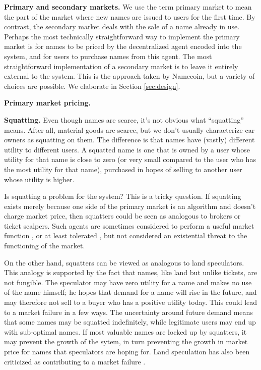 {\bf Primary and secondary markets.} We use the term primary market to mean the part of the market where new names are issued to users for the first time. By contrast, the secondary market deals with the sale of a name already in use. Perhaps the most technically straightforward way to implement the primary market is for names to be priced by the decentralized agent \hi{[elaborate]} encoded into the system, and for users to purchase names from this agent. The most straightforward implementation of a secondary market is to leave it entirely external to the system. This is the approach taken by Namecoin, but a variety of choices are possible. We elaborate in Section \ref{sec:design}.

{\bf Primary market pricing.} 

{\bf Squatting.} Even though names are scarce, it's not obvious what ``squatting'' means. After all, material goods are scarce, but we don't usually characterize car owners as squatting on them. The difference is that names have (vastly) different utility to different users. A squatted name is one that is owned by a user whose utility for that name is close to zero (or very small compared to the user who has the most utility for that name), purchased in hopes of selling to another user whose utility is higher.

Is squatting a problem for the system? This is a tricky question. If squatting exists merely because one side of the primary market is an algorithm and doesn't charge market price, then squatters could be seen as analogous to brokers or ticket scalpers. Such agents are sometimes considered to perform a useful market function \cite{}, or at least tolerated \cite{}, but not considered an existential threat to the functioning of the market.

On the other hand, squatters can be viewed as analogous to land speculators. This analogy is supported by the fact that names, like land but unlike tickets, are not fungible. The speculator may have zero utility for a name and makes no use of the name himself; he hopes that demand for a name will rise in the future, and may therefore not sell to a buyer who has a positive utility today. This could lead to a market failure in a few ways. The uncertainty around future demand means that some names may be squatted indefinitely, while legitimate users may end up with sub-optimal names. If most valuable names are locked up by squatters, it may prevent the growth of the sytem, in turn preventing the growth in market price for names that speculators are hoping for. Land speculation has also been criticized as contributing to a market failure \cite{archer73}. 


